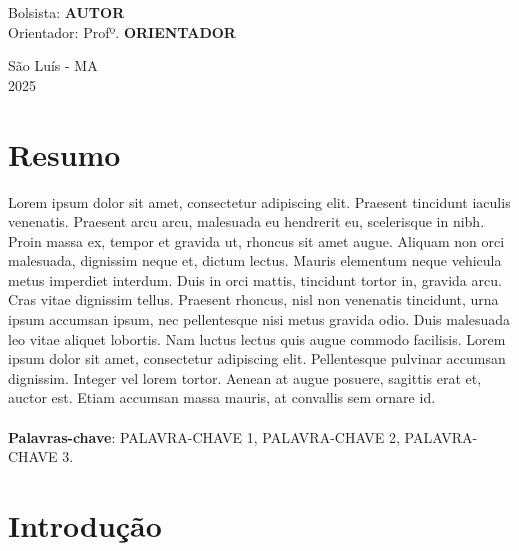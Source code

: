 \documentclass[a4paper, 12pt]{article}
\begin{document}
\begin{titlepage}
	\begin{flushleft}
	    			Bolsista: \textbf{AUTOR}\\
            \vspace{15pt}
			Orientador: Profº. \textbf{ORIENTADOR}\\
	\end{flushleft}

		

	\vspace{1cm}
	
	\begin{center}
		\vspace{\fill}
			 São Luís - MA\\
		 2025
			\end{center}
\end{titlepage}

\newpage
\tableofcontents
\thispagestyle{empty}
\newpage
{}
\section*{Resumo}
Lorem ipsum dolor sit amet, consectetur adipiscing elit. Praesent tincidunt iaculis venenatis. Praesent arcu arcu, malesuada eu hendrerit eu, scelerisque in nibh. Proin massa ex, tempor et gravida ut, rhoncus sit amet augue. Aliquam non orci malesuada, dignissim neque et, dictum lectus. Mauris elementum neque vehicula metus imperdiet interdum. Duis in orci mattis, tincidunt tortor in, gravida arcu. Cras vitae dignissim tellus. Praesent rhoncus, nisl non venenatis tincidunt, urna ipsum accumsan ipsum, nec pellentesque nisi metus gravida odio. Duis malesuada leo vitae aliquet lobortis. Nam luctus lectus quis augue commodo facilisis. Lorem ipsum dolor sit amet, consectetur adipiscing elit. Pellentesque pulvinar accumsan dignissim. Integer vel lorem tortor. Aenean at augue posuere, sagittis erat et, auctor est. Etiam accumsan massa mauris, at convallis sem ornare id.
\\
\\
\textbf{Palavras-chave}: PALAVRA-CHAVE 1, PALAVRA-CHAVE 2, PALAVRA-CHAVE 3.  

\newpage

\section{Introdução}
\end{document}
